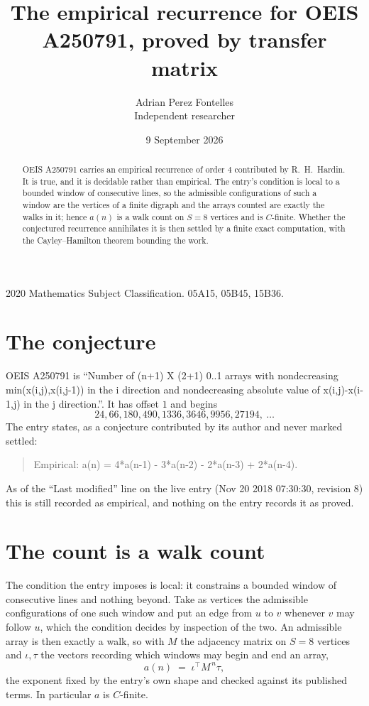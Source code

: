 \documentclass[11pt,a4paper]{article}
\title{The empirical recurrence for OEIS A250791, proved by transfer matrix}
\author{Adrian Perez Fontelles\\ \small Independent researcher}
\date{9 September 2026}
\theoremstyle{plain}
\theoremstyle{definition}
\begin{document}
\maketitle

\begin{abstract}
OEIS A250791 carries an empirical recurrence of order $4$ contributed by R.~H.~Hardin. It is
true, and it is decidable rather than empirical. The entry's condition is local to a bounded window of consecutive lines, so
the admissible configurations of such a window are the vertices of a finite digraph and the
arrays counted are exactly the walks in it; hence $a(n)$ is a walk count on $S=8$ vertices
and is $C$-finite. Whether the conjectured recurrence annihilates it is then settled by a
finite exact computation, with the Cayley--Hamilton theorem bounding the work.
\end{abstract}

\noindent\small 2020 Mathematics Subject Classification. 05A15, 05B45, 15B36.\normalsize

\section{The conjecture}

OEIS A250791 is ``Number of (n+1) X (2+1) 0..1 arrays with nondecreasing min(x(i,j),x(i,j-1)) in the i direction and nondecreasing absolute value of x(i,j)-x(i-1,j) in the j direction.''. It has offset $1$ and begins
\[
24, 66, 180, 490, 1336, 3646, 9956, 27194,\ \dots
\]
The entry states, as a conjecture contributed by its author and never marked settled:
\begin{quote}
Empirical: a(n) = 4*a(n-1) - 3*a(n-2) - 2*a(n-3) + 2*a(n-4).
\end{quote}
As of the ``Last modified'' line on the live entry (Nov 20 2018 07:30:30, revision 8) this is still
recorded as empirical, and nothing on the entry records it as proved.

\section{The count is a walk count}

The condition the entry imposes is local: it constrains a bounded window of consecutive lines and nothing beyond. Take as
vertices the admissible configurations of one such window and put an edge from $u$ to $v$
whenever $v$ may follow $u$, which the condition decides by inspection of the two. An
admissible array is then exactly a walk, so with $M$ the adjacency matrix on $S=8$ vertices
and $\iota,\tau$ the vectors recording which windows may begin and end an array,
\[
a(n)\;=\;\iota^{\!\top}M^{\,n}\tau ,
\]
the exponent fixed by the entry's own shape and checked against its published terms. In
particular $a$ is $C$-finite.
\end{document}
